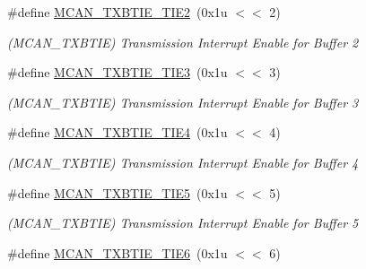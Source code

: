 \begin{DoxyCompactItemize}
\mbox{\label{group__SAMV71__MCAN_ga6b3b871d24e3103e77381b16cb0c012c}} 
\#define \mbox{\hyperlink{group__SAMV71__MCAN_ga6b3b871d24e3103e77381b16cb0c012c}{M\+C\+A\+N\+\_\+\+T\+X\+B\+T\+I\+E\+\_\+\+T\+I\+E2}}~(0x1u $<$$<$ 2)
\begin{DoxyCompactList}\small\item\em (M\+C\+A\+N\+\_\+\+T\+X\+B\+T\+IE) Transmission Interrupt Enable for Buffer 2 \end{DoxyCompactList}\item 
\mbox{\label{group__SAMV71__MCAN_ga97745bdc2897959ad0d236a52dfe56f7}} 
\#define \mbox{\hyperlink{group__SAMV71__MCAN_ga97745bdc2897959ad0d236a52dfe56f7}{M\+C\+A\+N\+\_\+\+T\+X\+B\+T\+I\+E\+\_\+\+T\+I\+E3}}~(0x1u $<$$<$ 3)
\begin{DoxyCompactList}\small\item\em (M\+C\+A\+N\+\_\+\+T\+X\+B\+T\+IE) Transmission Interrupt Enable for Buffer 3 \end{DoxyCompactList}\item 
\mbox{\label{group__SAMV71__MCAN_ga9bc2237b657152faef6c6dc94c0f4884}} 
\#define \mbox{\hyperlink{group__SAMV71__MCAN_ga9bc2237b657152faef6c6dc94c0f4884}{M\+C\+A\+N\+\_\+\+T\+X\+B\+T\+I\+E\+\_\+\+T\+I\+E4}}~(0x1u $<$$<$ 4)
\begin{DoxyCompactList}\small\item\em (M\+C\+A\+N\+\_\+\+T\+X\+B\+T\+IE) Transmission Interrupt Enable for Buffer 4 \end{DoxyCompactList}\item 
\mbox{\label{group__SAMV71__MCAN_ga8ea91615985e6935395da670f5a9d8a8}} 
\#define \mbox{\hyperlink{group__SAMV71__MCAN_ga8ea91615985e6935395da670f5a9d8a8}{M\+C\+A\+N\+\_\+\+T\+X\+B\+T\+I\+E\+\_\+\+T\+I\+E5}}~(0x1u $<$$<$ 5)
\begin{DoxyCompactList}\small\item\em (M\+C\+A\+N\+\_\+\+T\+X\+B\+T\+IE) Transmission Interrupt Enable for Buffer 5 \end{DoxyCompactList}\item 
\mbox{\label{group__SAMV71__MCAN_ga0ab6cd89ac8133b2648ff5079c2843cf}} 
\#define \mbox{\hyperlink{group__SAMV71__MCAN_ga0ab6cd89ac8133b2648ff5079c2843cf}{M\+C\+A\+N\+\_\+\+T\+X\+B\+T\+I\+E\+\_\+\+T\+I\+E6}}~(0x1u $<$$<$ 6)
$$
\end{DoxyCompactItemize}
